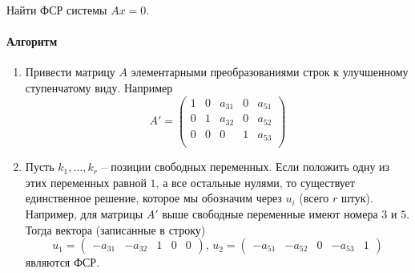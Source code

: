 Найти ФСР системы $Ax = 0$.

\paragraph{Алгоритм}

\begin{enumerate}
\item Привести матрицу $A$ элементарными преобразованиями строк к улучшенному ступенчатому виду.
Например
\[
A' = 
\begin{pmatrix}
{1}&{0}&{a_{31}}&{0}&{a_{51}}\\
{0}&{1}&{a_{32}}&{0}&{a_{52}}\\
{0}&{0}&{0}&{1}&{a_{53}}\\
\end{pmatrix}
\]

\item Пусть $k_1,\ldots,k_r$ -- позиции свободных переменных.
Если положить одну из этих переменных равной $1$, а все остальные нулями, то существует единственное решение, которое мы обозначим через $u_i$ (всего $r$ штук).
Например, для матрицы $A'$ выше свободные переменные имеют номера $3$ и $5$.
Тогда вектора (записанные в строку)
\[
u_1 = 
\begin{pmatrix}
{-a_{31}}&{-a_{32}}&{1}&{0}&{0}
\end{pmatrix},\,
u_2 = 
\begin{pmatrix}
{-a_{51}}&{-a_{52}}&{0}&{-a_{53}}&{1}
\end{pmatrix}
\]
являются ФСР.
\end{enumerate}

